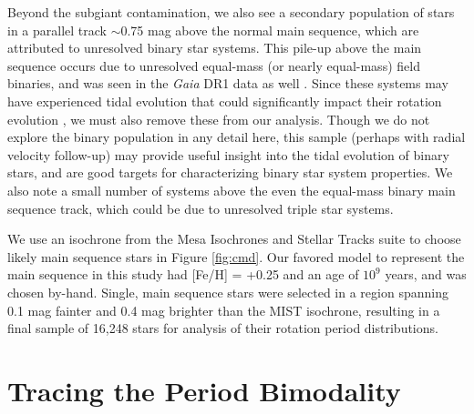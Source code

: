 \documentclass[preprint2]{aastex62}
\begin{document}
Beyond the subgiant contamination, we also see a secondary population of stars in a parallel track $\sim$0.75 mag above the normal main sequence, which are attributed to unresolved binary star systems. This pile-up above the main sequence occurs due to unresolved equal-mass (or nearly equal-mass) field binaries, and was seen in the {\em Gaia} DR1 data as well \citep{anderson2017}. Since these systems may have experienced tidal evolution that could significantly impact their rotation evolution \citep[e.g.][]{lurie2017}, we must also remove these from our analysis. Though we do not explore the binary population in any detail here, this sample (perhaps with radial velocity follow-up) may provide useful insight into the tidal evolution of binary stars, and are good targets for characterizing binary star system properties. We also note a small number of systems above the even the equal-mass binary main sequence track, which could be due to unresolved triple star systems.

We use an isochrone from the Mesa Isochrones and Stellar Tracks suite \citep[MIST;][]{MIST} to choose likely main sequence stars in Figure \ref{fig:cmd}. Our favored model to represent the main sequence in this study had [Fe/H] = +0.25 and an age of $10^9$ years, and was chosen by-hand. Single, main sequence stars were selected in a region spanning 0.1 mag fainter and 0.4 mag brighter than the MIST isochrone, resulting in a final sample  of 16,248 stars for analysis of their rotation period distributions.







\section{Tracing the Period Bimodality}
\end{document}
